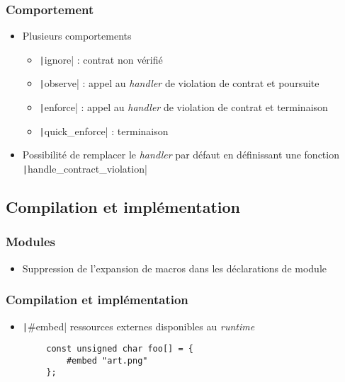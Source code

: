\documentclass[C++.tex]{subfiles}
\begin{document}
\begin{frame}[fragile]
	\frametitle{Comportement}
	\begin{itemize}
		\item Plusieurs comportements
		\begin{itemize}
			\item \texttt|ignore| : contrat non vérifié
			\item \texttt|observe| : appel au \textit{handler} de violation de contrat et poursuite
			\item \texttt|enforce| : appel au \textit{handler} de violation de contrat et terminaison
			\item \texttt|quick_enforce| : terminaison

		\end{itemize}
		\item Possibilité de remplacer le \textit{handler} par défaut en définissant une fonction \texttt|handle_contract_violation|

	\end{itemize}

\end{frame}

\subsection*{Compilation et implémentation}
\begin{frame}[fragile]
	\frametitle{Modules}
	\begin{itemize}
		\item Suppression de l'expansion de macros dans les déclarations de module
	\end{itemize}

\end{frame}

\begin{frame}[fragile]
	\frametitle{Compilation et implémentation}
	\begin{itemize}
		\item \texttt|#embed| ressources externes disponibles au \textit{runtime}
	\end{itemize}

	\begin{verbatim}
		const unsigned char foo[] = {
			#embed "art.png"
		};
	\end{verbatim}

\end{frame}
\end{document}
